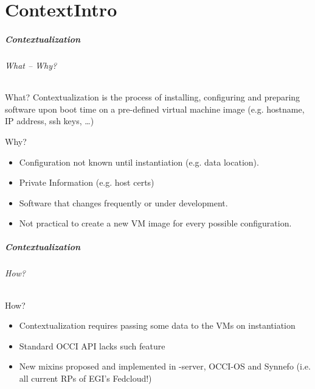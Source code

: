 \part{ContextIntro}

\begin{frame}
  \frametitle{Contextualization}
  \framesubtitle{What -- Why?}

  \begin{block}{What?}
    Contextualization is the process of installing, configuring and
    preparing software upon boot time on a pre-defined virtual machine
    image (e.g. hostname, IP address, ssh keys, \dots)
  \end{block}

  \begin{block}{Why?}
    \begin{itemize}
      \item Configuration not known until instantiation (e.g. data location).
      \item Private Information (e.g. host certs)
      \item Software that changes frequently or under development.
      \item Not practical to create a new VM image for every possible configuration.
    \end{itemize}
  \end{block}
\end{frame}


\begin{frame}
  \frametitle{Contextualization}
  \framesubtitle{How?}

  \begin{block}{How?}
    \begin{itemize}
      \item Contextualization requires passing some data to the VMs on
            instantiation
      \item Standard OCCI API lacks such feature
      \item New mixins proposed and implemented in \rocci-server, OCCI-OS and Synnefo (i.e. all current RPs of EGI's Fedcloud!)
    \end{itemize}
  \end{block}

\end{frame}

